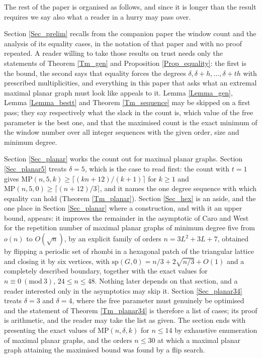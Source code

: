\documentclass[10pt,a4paper]{article}
\begin{document}

The rest of the paper is organised as follows, and since it is longer than the result requires we say
also what a reader in a hurry may pass over.

Section \ref{Sec_prelim} recalls from the companion paper \cite{P1} the window count and the analysis of
its equality cases, in the notation of that paper and with no proof repeated. A reader willing to take
those results on trust needs only the statements of Theorem \ref{Tm_gen} and Proposition
\ref{Prop_equality}: the first is the bound, the second says that equality forces the degrees
$\delta ,\delta +h,\ldots ,\delta +th$ with prescribed multiplicities, and everything in this paper that
asks what an extremal maximal planar graph must look like appeals to it. Lemma \ref{Lemma_gen}, Lemma
\ref{Lemma_bestt} and Theorem \ref{Tm_sequence} may be skipped on a first pass; they say respectively
what the slack in the count is, which value of the free parameter is the best one, and that the
maximised count is the exact minimum of the window number over all integer sequences with the given
order, size and minimum degree.

Section \ref{Sec_planar} works the count out for maximal planar graphs. Section \ref{Sec_planar5} treats
$\delta =5$, which is the case to read first: the count with $t=1$ gives
$\mathrm{MP}(n,5,k)\geq \lceil (kn+12)/(k+1)\rceil $ for $k\geq 1$ and
$\mathrm{MP}(n,5,0)\geq \lceil (n+12)/3\rceil $, and it names the one degree sequence with which
equality can hold (Theorem \ref{Tm_planar}). Section \ref{Sec_hex} is an aside, and the one place in Section \ref{Sec_planar} where a construction,
and with it an upper bound, appears: it improves the remainder in the asymptotic of Caro and West
\cite{CaroWest} for the repetition number of maximal planar graphs of minimum degree five from $o(n)$ to
$O(\sqrt{n})$, by an explicit family of orders $n=3L^{2}+3L+7$, obtained by
flipping a periodic set of rhombi in a hexagonal patch of the triangular lattice and closing it by six
vertices, with $\mathrm{sp}(G,0)=n/3+2\sqrt{n/3}+O(1)$ and a completely described boundary, together
with the exact values for $n\equiv 0\ (\mathrm{mod}\ 3)$, $24\leq n\leq 48$. Nothing later depends on
that section, and a reader interested only in the asymptotics may skip it. Section \ref{Sec_planar34} treats $\delta =3$ and $\delta =4$, where the free parameter
must genuinely be optimised and the statement of Theorem \ref{Tm_planar34} is therefore a list of cases;
its proof is arithmetic, and the reader may take the list as given. The section ends with presenting the exact values of $\mathrm{MP}(n,\delta ,k)$ for $n\leq 14$ by
exhaustive enumeration of maximal planar graphs, and the orders $n\leq 30$ at which a maximal planar graph attaining
the maximised bound was found by a flip search.
\end{document}
